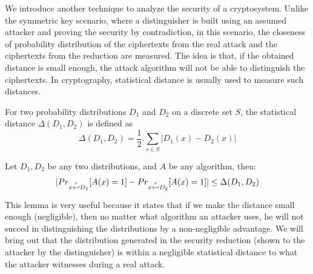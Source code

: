 \begin{description}
  We introduce another technique to analyze the security of a
  cryptosystem. Unlike the symmetric key scenario, where a
  distinguisher is built using an assumed attacker and proving the security by
  contradiction, in this scenario, the closeness of probability
  distribution of the ciphertexts from the real attack and the ciphertexts from the reduction are measured. The
  idea is that, if the obtained distance is small enough, the attack algorithm will not be able to
  distinguish the ciphertexts. In cryptography, statistical distance is usually
  used to measure such distances.
  \begin{definition}
     For two probability distributions $D_1$ and $D_2$ on
    a discrete set $S$, the statistical distance $\Delta(D_1,D_2)$ is defined as
    \[
      \Delta(D_1, D_2) = \frac{1}{2}. \sum_{s \in S}|D_1(x) - D_2(x)|
    \]
    \label{def:statisticalDistance}
  \end{definition}
  \begin{lemma}
    Let $D_1, D_2$ be any two distributions, and $A$ be any algorithm, then:
    \[
      |Pr_{x\stackrel{r}{\hookleftarrow} D_1}[A(x) = 1] - Pr_{x\stackrel{r}{\hookleftarrow} D_2}[A(x) = 1]|
      \leq \Delta(D_1, D_2)
    \]
    \label{lem:statisticalDistance}
  \end{lemma}
  This lemma is very useful because it states that if we make the distance small
  enough (negligible), then no matter what algorithm an attacker uses, he will not succed in distinguishing the distributions by a non-negligible advantage. We will
  bring out that the distribution generated in the security reduction (shown to the attacker by the
  distinguisher) is within a negligible statistical
  distance to what the attacker witnesses during a real attack.




\end{description}
